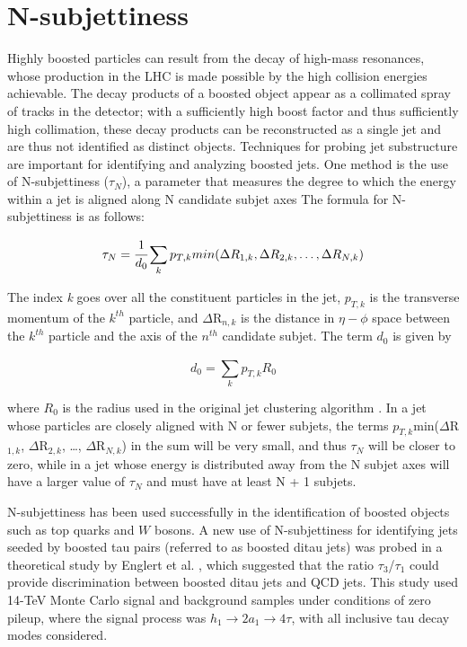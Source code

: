 \chapter{N-subjettiness\label{sec:nsubj}}

Highly boosted particles can result from the decay of high-mass resonances, whose production in the LHC is made possible by the high collision energies achievable. The decay products of a boosted object appear as a collimated spray of tracks in the detector; with a sufficiently high boost factor and thus sufficiently high collimation, these decay products can be reconstructed as a single jet and are thus not identified as distinct objects. Techniques for probing jet substructure are important for identifying and analyzing boosted jets. One method is the use of N-subjettiness ($\tau_{N}$), a parameter that measures the degree to which the energy within a jet is aligned along N candidate subjet axes\newline
The formula for N-subjettiness is as follows:

\begin{equation}
\tau_{N} = \cfrac{1}{d_{0}}\sum_{k}^{}p_{T,k}min(\Delta R_{1,k},\Delta R_{2,k},\dots,\Delta R_{N,k})
\label{eq:Nsubj}
\end{equation}

\noindent The index \emph{k} goes over all the constituent particles in the jet, $p_{T,k}$ is the transverse momentum of the $k^{th}$ particle, and $\Delta$R$_{n,k}$ is the distance in $\eta-\phi$ space between the $k^{th}$ particle and the axis of the $n^{th}$ candidate subjet. The term $d_{0}$ is given by

\begin{equation}
d_{0} = \sum_{k}^{}p_{T,k}R_0
\label{eq:d0}
\end{equation}

\noindent where $R_{0}$ is the radius used in the original jet clustering algorithm \cite{Thaler:2010tr}.\newline
In a jet whose particles are closely aligned with N or fewer subjets, the terms $p_{T,k}$min($\Delta$R$_{1,k}$, $\Delta$R$_{2,k}$, \dots, $\Delta$R$_{N,k}$) in the sum will be very small, and thus $\tau_{N}$ will be closer to zero, while in a jet whose energy is distributed away from the N subjet axes will have a larger value of $\tau_{N}$ and must have at least N + 1 subjets.

N-subjettiness has been used successfully in the identification of boosted objects such as top quarks and $W$ bosons. A new use of N-subjettiness for identifying jets seeded by boosted tau pairs (referred to as boosted ditau jets) was probed in a theoretical study by Englert et al. \cite{Englert:2011iz}, which suggested that the ratio $\tau_{3}$/$\tau_{1}$ could provide discrimination between boosted ditau jets and QCD jets. This study used 14-TeV Monte Carlo signal and background samples under conditions of zero pileup, where the signal process was  $h_{1}\rightarrow 2a_{1}\rightarrow 4\tau$, with all inclusive tau decay modes considered.

